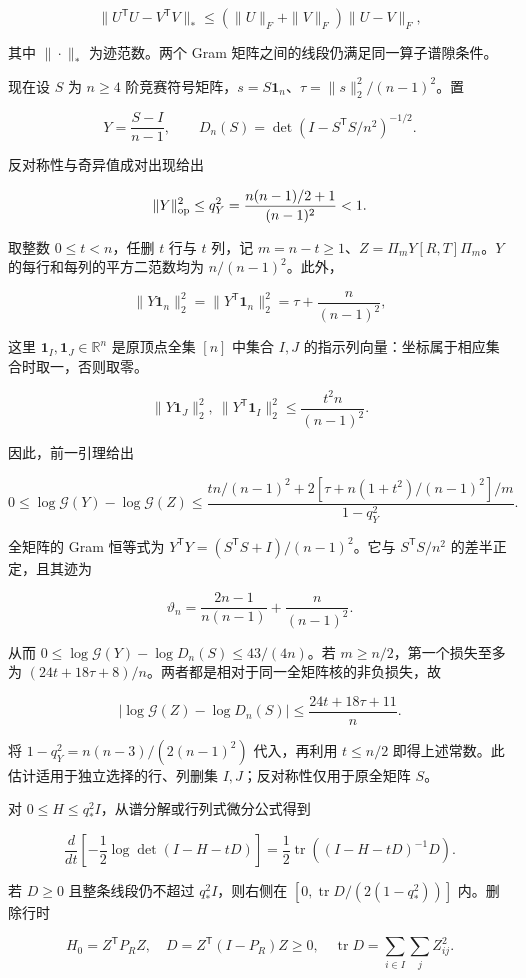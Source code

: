 \documentclass[11pt,a4paper]{article}
\begin{document}
\[\|U^{\mathsf T}U-V^{\mathsf T}V\|_*\le(\|U\|_F+\|V\|_F)\|U-V\|_F,\]

其中 \(\|\cdot\|_*\) 为迹范数。两个 Gram 矩阵之间的线段仍满足同一算子谱隙条件。

现在设 \(S\) 为 \(n\ge4\) 阶竞赛符号矩阵，\(s=S\mathbf 1_n\)、\(\tau=\|s\|_2^2/(n-1)^2\)。置

\[Y=\frac{S-I}{n-1},\qquad D_n(S)=\det(I-S^{\mathsf T}S/n^2)^{-1/2}.\]

反对称性与奇异值成对出现给出

\[\|Y\|_{\rm op}^2\le q_Y^2=\frac{n(n-1)/2+1}{(n-1)^2}<1.\]

取整数 \(0\le t<n\)，任删 \(t\) 行与 \(t\) 列，记 \(m=n-t\ge1\)、\(Z=\Pi_mY[R,T]\Pi_m\)。\(Y\) 的每行和每列的平方二范数均为 \(n/(n-1)^2\)。此外，

\[\|Y\mathbf 1_n\|_2^2=\|Y^{\mathsf T}\mathbf 1_n\|_2^2=\tau+\frac n{(n-1)^2},\]

这里 \(\mathbf1_I,\mathbf1_J\in\mathbb R^n\) 是原顶点全集 \([n]\) 中集合 \(I,J\) 的指示列向量：坐标属于相应集合时取一，否则取零。

\[\|Y\mathbf 1_J\|_2^2,\ \|Y^{\mathsf T}\mathbf 1_I\|_2^2\le\frac{t^2n}{(n-1)^2}.\]

因此，前一引理给出

\[0\le\log\mathcal G(Y)-\log\mathcal G(Z)\le\frac{t n/(n-1)^2+2[\tau+n(1+t^2)/(n-1)^2]/m}{1-q_Y^2}.\]

全矩阵的 Gram 恒等式为 \(Y^{\mathsf T}Y=(S^{\mathsf T}S+I)/(n-1)^2\)。它与 \(S^{\mathsf T}S/n^2\) 的差半正定，且其迹为

\[\vartheta_n=\frac{2n-1}{n(n-1)}+\frac n{(n-1)^2}.\]

从而 \(0\le\log\mathcal G(Y)-\log D_n(S)\le43/(4n)\)。若 \(m\ge n/2\)，第一个损失至多为 \((24t+18\tau+8)/n\)。两者都是相对于同一全矩阵核的非负损失，故

\[|\log\mathcal G(Z)-\log D_n(S)|\le\frac{24t+18\tau+11}{n}.\]

将 \(1-q_Y^2=n(n-3)/(2(n-1)^2)\) 代入，再利用 \(t\le n/2\) 即得上述常数。此估计适用于独立选择的行、列删集 \(I,J\)；反对称性仅用于原全矩阵 \(S\)。

对 \(0\le H\le q_*^2I\)，从谱分解或行列式微分公式得到

\[\frac{d}{dt}\left[-\frac12\log\det(I-H-tD)\right]
=\frac12\operatorname{tr}((I-H-tD)^{-1}D).\]

若 \(D\ge0\) 且整条线段仍不超过 \(q_*^2I\)，则右侧在 \([0,\operatorname{tr}D/(2(1-q_*^2))]\) 内。删除行时

\[H_0=Z^{\mathsf T}P_RZ,\quad
D=Z^{\mathsf T}(I-P_R)Z\ge0,\quad
\operatorname{tr}D=\sum_{i\in I}\sum_jZ_{ij}^2.\]
\end{document}
